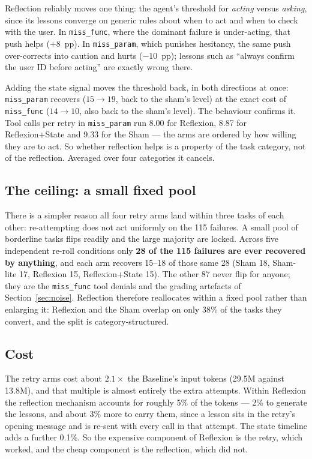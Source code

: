 \documentclass[a4paper, 12pt]{article}
\begin{document}
Reflection reliably moves one thing: the agent's threshold for \emph{acting}
versus \emph{asking}, since its lessons converge on generic rules about when to
act and when to check with the user. In \texttt{miss\_func}, where the dominant
failure is under-acting, that push helps ($+8$~pp). In \texttt{miss\_param},
which punishes hesitancy, the same push over-corrects into caution and hurts
($-10$~pp); lessons such as ``always confirm the user ID before acting'' are
exactly wrong there.

Adding the state signal moves the threshold back, in both directions at once:
\texttt{miss\_param} recovers ($15\to19$, back to the sham's level) at the exact
cost of \texttt{miss\_func} ($14\to10$, also back to the sham's level). The
behaviour confirms it. Tool calls per retry in \texttt{miss\_param} run 8.00 for
Reflexion, 8.87 for Reflexion+State and 9.33 for the Sham --- the arms are
ordered by how willing they are to act. So whether reflection helps is a property
of the task category, not of the reflection. Averaged over four categories it cancels.

\subsection{The ceiling: a small fixed pool}
\label{sec:ceiling}

There is a simpler reason all four retry arms land within three tasks of each
other: re-attempting does not act uniformly on the 115 failures. A small pool of
borderline tasks flips readily and the large majority are locked. Across five
independent re-roll conditions only \textbf{28 of the 115 failures are ever
recovered by anything}, and each arm recovers 15--18 of those same 28 (Sham 18,
Sham-lite 17, Reflexion 15, Reflexion+State 15). The other 87 never flip for
anyone; they are the \texttt{miss\_func} tool denials and the grading artefacts
of Section~\ref{sec:noise}. Reflection therefore reallocates within a fixed pool
rather than enlarging it: Reflexion and the Sham overlap on only 38\% of the
tasks they convert, and the split is category-structured.

\subsection{Cost}

The retry arms cost about $2.1\times$ the Baseline's input tokens (29.5M against 13.8M),
and that multiple is almost entirely the extra attempts. Within Reflexion the reflection
mechanism accounts for roughly 5\% of the tokens --- 2\% to generate the lessons, and about
3\% more to carry them, since a lesson sits in the retry's opening message and is re-sent with
every call in that attempt. The state timeline adds a further 0.1\%. So the expensive
component of Reflexion is the retry, which worked, and the cheap component is the reflection, which did not.
\end{document}
